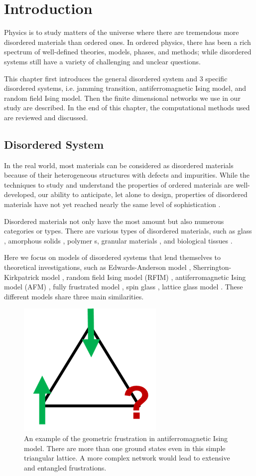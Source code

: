 \chapter{Introduction}
\label{chap-intro}

Physics is to study matters of the universe where 
there are tremendous more disordered materials than ordered ones.
In ordered physics, there has been a rich spectrum of 
well-defined theories, models, phases, and methods; while disordered 
systems still have a variety of challenging and unclear questions. 

This chapter first introduces the general disordered system and 3 specific disordered systems, i.e. jamming transition, antiferromagnetic Ising model, and random field Ising model. Then the finite dimensional networks we use in our study are described. In the end of this chapter, the computational methods used are reviewed and discussed.

\section{Disordered System}
In the real world, most materials can be considered as disordered materials because of their heterogeneous structures with defects and impurities. While the techniques to study and understand the properties of ordered materials are well-developed, our
ability to anticipate, let alone to design, properties of disordered materials have not yet reached nearly the same level of sophistication \cite{Kotani16Material}. 

Disordered materials not only have the most amount but also numerous categories or types. There are various types of disordered materials, such as glass \cite{Gibbs1958nature, berthier2016facets}, amorphous solids \cite{berthier2016facets}, polymer s\cite{roth2005glass}, granular materials \cite{richard2005slow}, and biological tissues \cite{bi2015density}. 

Here we focus on models of disordered systems that lend themselves to theoretical investigations, such as Edwards-Anderson model \cite{edwards1975theory}, Sherrington-Kirkpatrick model \cite{sherrington1975}, random field Ising model (RFIM) \cite{imry1975random}, antiferromagnetic Ising model (AFM) \cite{wannier1950afm},  fully frustrated model \cite{kosterlitz1973ordering, kosterlitz1974critical}, spin glass \cite{young1997spin}, lattice glass model \cite{Biroli02}. These different models share  three main similarities. 
\begin{figure}[h]
\centering \includegraphics[width=0.2\columnwidth]{Chapter-1/geo_frustration.png} 
\protect\caption{\label{fig:intro-gf} An example of the geometric frustration in antiferromagnetic Ising model. There are more than one ground states even in this simple triangular lattice. A more complex network would lead to extensive and entangled frustrations.}
\end{figure}

